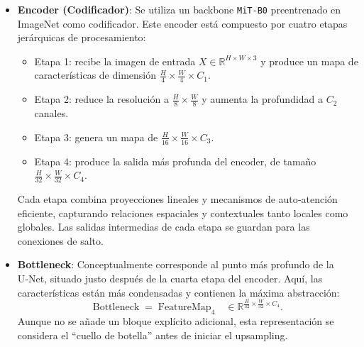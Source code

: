 \begin{itemize}
  \item \textbf{Encoder (Codificador)}:  
    Se utiliza un backbone \texttt{MiT-B0} preentrenado en ImageNet como codificador. Este encoder está compuesto por cuatro etapas jerárquicas de procesamiento:
    \begin{itemize}
      \item Etapa 1: recibe la imagen de entrada $X\in\mathbb{R}^{H\times W\times3}$ y produce un mapa de características de dimensión $\frac{H}{4}\times\frac{W}{4}\times C_1$.
      \item Etapa 2: reduce la resolución a $\frac{H}{8}\times\frac{W}{8}$ y aumenta la profundidad a $C_2$ canales.
      \item Etapa 3: genera un mapa de $\frac{H}{16}\times\frac{W}{16}\times C_3$.
      \item Etapa 4: produce la salida más profunda del encoder, de tamaño $\frac{H}{32}\times\frac{W}{32}\times C_4$.
    \end{itemize}
    Cada etapa combina proyecciones lineales y mecanismos de auto‑atención eficiente, capturando relaciones espaciales y contextuales tanto locales como globales. Las salidas intermedias de cada etapa se guardan para las conexiones de salto.

  \item \textbf{Bottleneck}:  
    Conceptualmente corresponde al punto más profundo de la U‑Net, situado justo después de la cuarta etapa del encoder. Aquí, las características están más condensadas y contienen la máxima abstracción:
    \[
      \text{Bottleneck} \;=\; \text{FeatureMap}_{4}\quad\in\mathbb{R}^{\frac{H}{32}\times\frac{W}{32}\times C_4}.
    \]
    Aunque no se añade un bloque explícito adicional, esta representación se considera el “cuello de botella” antes de iniciar el upsampling.


\end{itemize}
